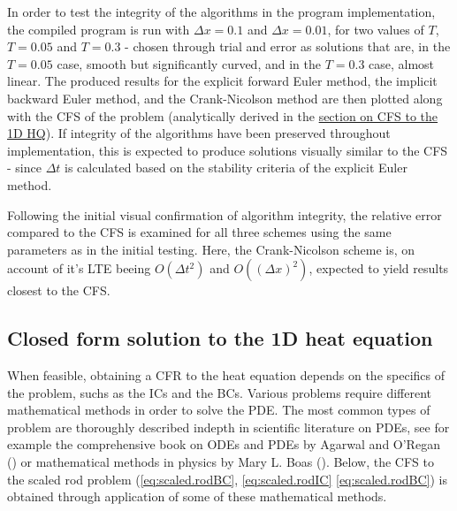 \documentclass[%
oneside,                 %
final,                   %
10pt]{article}
\begin{document}
In order to test the integrity of the algorithms in the program implementation, the compiled program is run with $\Delta x=0.1$ and $\Delta x=0.01$, for two values of $T$, $T=0.05$ and $T=0.3$ - chosen through trial and error as solutions that are, in the $T=0.05$ case, smooth but significantly curved, and in the $T=0.3$ case, almost linear. The produced results for the explicit forward Euler method, the implicit backward Euler method, and the Crank-Nicolson method are then plotted along with the CFS of the problem (analytically derived in the \hyperref[M.CFS1d]{section on CFS to the 1D HQ}). If integrity of the algorithms have been preserved throughout implementation, this is expected to produce solutions visually similar to the CFS - since $\Delta t$ is calculated based on the stability criteria of the explicit Euler method. \newline

Following the initial visual confirmation of algorithm integrity, the relative error compared to the CFS is examined for all three schemes using the same parameters as in the initial testing. Here, the Crank-Nicolson scheme is, on account of it's LTE beeing $O(\Delta t^2)$ and $O((\Delta x)^2)$, expected to yield results closest to the CFS.


\subsection{Closed form solution to the 1D heat equation}
\label{M.CFS1d}
When feasible, obtaining a CFR to the heat equation depends on the specifics of the problem, suchs as the ICs and the BCs. Various problems require different mathematical methods in order to solve the PDE. The most common types of problem are thoroughly described indepth in scientific literature on PDEs, see for example the comprehensive book on ODEs and PDEs by Agarwal and O’Regan (\cite{ravi}) or mathematical methods in physics by Mary L. Boas (\cite{matmet}). Below, the CFS to the scaled rod problem (\eqref{eq:scaled.rodBC}, \eqref{eq:scaled.rodIC} \eqref{eq:scaled.rodBC}) is obtained through  application of some of these mathematical methods. \newline
\end{document}

